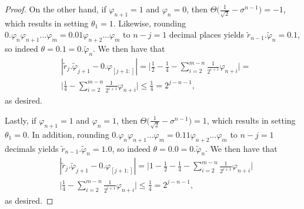 \documentclass[aps,pra,showpacs,notitlepage,twocolumn,superscriptaddress,nofootinbib]{revtex4-1}
\begin{document}
\begin{proof}
On the other hand, if $\varphi_{n+1} = 1$ and $\varphi_n=0$, then $\Theta\big(\frac{1}{\sqrt{2}}-\sigma^{n-1}\big) = -1 $, which results in setting $\theta_1 = 1$. Likewise, rounding $0.\varphi_{n}\varphi_{n+1}...\varphi_{m} = 0.01\varphi_{n+2}...\varphi_{m}$ to $n-j = 1$ decimal places yields $\tilde{r}_{n-1}.\tilde{\varphi}_n = 0.1 $, so indeed $\theta = 0.1 = 0.\tilde{\varphi}_n$. We then have that 
\begin{equation}
\begin{split}
    &|\tilde{r}_{j}.\tilde{\varphi}_{j+1} - 0.\varphi_{[j+1:]}| = \Big|\frac{1}{2} - \frac{1}{4} - \sum_{i=2}^{m-n}\frac{1}{2^{i+1}}\varphi_{n+i} \Big|= \\ &\Big|\frac{1}{4} - \sum_{i=2}^{m-n}\frac{1}{2^{i+1}}\varphi_{n+i} \Big| \leq \frac{1}{4} = 2^{j-n-1},
\end{split}
\end{equation}
as desired.

Lastly, if $\varphi_{n+1} = 1$ and $\varphi_n=1$, then $\Theta\big(\frac{1}{\sqrt{2}}-\sigma^{n-1}\big) = 1 $, which results in setting $\theta_1 = 0$. In addition, rounding $0.\varphi_{n}\varphi_{n+1}...\varphi_{m} = 0.11\varphi_{n+2}...\varphi_{m}$ to $n-j = 1$ decimals yields $\tilde{r}_{n-1}.\tilde{\varphi}_n = 1.0$, so indeed $\theta = 0.0 = 0.\tilde{\varphi}_n$. We then have that 
\begin{equation}
\begin{split}
    &|\tilde{r}_{j}.\tilde{\varphi}_{j+1} - 0.\varphi_{[j+1:]}| = \Big|1 - \frac{1}{2} - \frac{1}{4} - \sum_{i=2}^{m-n}\frac{1}{2^{i+1}}\varphi_{n+i} \Big| \\ &\Big|\frac{1}{4} - \sum_{i=2}^{m-n}\frac{1}{2^{i+1}}\varphi_{n+i} \Big| \leq \frac{1}{4} = 2^{j-n-1},
\end{split}
\end{equation}
as desired.



\end{proof}
\end{document}
